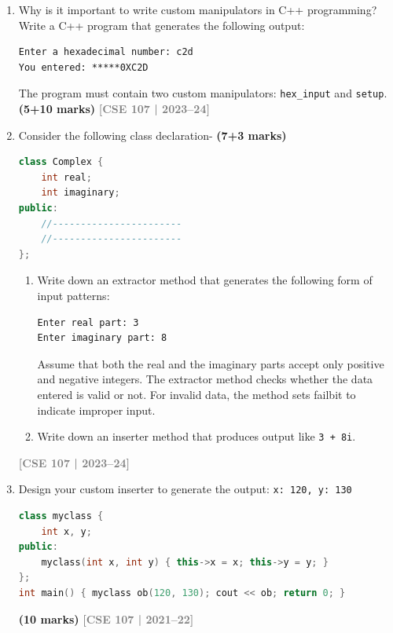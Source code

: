 \documentclass[12pt,a3paper]{article}
\newcommand{\yr}[1]{\hfill\textcolor{gray}{\small\textbf{[#1]}}}
\newcommand{\mk}[1]{\textcolor{orange!70!black}{\small\textbf{(#1 marks)}}}
\begin{document}
\begin{enumerate}
\item Why is it important to write custom manipulators in C++ programming? Write a C++ program that generates the following output:
\begin{verbatim}
Enter a hexadecimal number: c2d
You entered: *****0XC2D
\end{verbatim}
The program must contain two custom manipulators: \texttt{hex\_input} and \texttt{setup}. \mk{5+10}
\yr{CSE 107 | 2023--24}





\item Consider the following class declaration- \mk{7+3}

\begin{lstlisting}[language=C++]
class Complex {
    int real;
    int imaginary;
public:
    //-----------------------
    //-----------------------
};
\end{lstlisting}

\begin{enumerate}
    \item Write down an extractor method that generates the following form of input patterns:
\begin{verbatim}
Enter real part: 3
Enter imaginary part: 8
\end{verbatim}
    Assume that both the real and the imaginary parts accept only positive and negative integers. The extractor method checks whether the data entered is valid or not. For invalid data, the method sets failbit to indicate improper input.
    \item Write down an inserter method that produces output like \texttt{3 + 8i}.
\end{enumerate}
\yr{CSE 107 | 2023--24}





\item Design your custom inserter to generate the output: \texttt{x: 120, y: 130}
\begin{lstlisting}[language=C++]
class myclass {
    int x, y;
public:
    myclass(int x, int y) { this->x = x; this->y = y; }
};
int main() { myclass ob(120, 130); cout << ob; return 0; }
\end{lstlisting}
\mk{10}
\yr{CSE 107 | 2021--22}





\end{enumerate}
\end{document}

